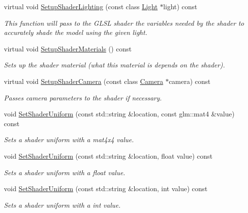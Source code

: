 \begin{DoxyCompactItemize}
virtual void \hyperlink{class_shader_program_a02cf3df43c59808160fce158ad655a40}{Setup\+Shader\+Lighting} (const class \hyperlink{class_light}{Light} $\ast$light) const
\begin{DoxyCompactList}\small\item\em This function will pass to the G\+L\+SL shader the variables needed by the shader to accurately shade the model using the given light. \end{DoxyCompactList}\item
virtual void \hyperlink{class_shader_program_a20ea5669f122fa6143e7fa8ee9d92578}{Setup\+Shader\+Materials} () const
\begin{DoxyCompactList}\small\item\em Sets up the shader material (what this material is depends on the shader). \end{DoxyCompactList}\item
virtual void \hyperlink{class_shader_program_abefd4e66aae75993f05bd607b6b0ed22}{Setup\+Shader\+Camera} (const class \hyperlink{class_camera}{Camera} $\ast$camera) const
\begin{DoxyCompactList}\small\item\em Passes camera parameters to the shader if necessary. \end{DoxyCompactList}\item
void \hyperlink{class_shader_program_a84ff179a393c8dcd55c38eef19925fef}{Set\+Shader\+Uniform} (const std\+::string \&location, const glm\+::mat4 \&value) const
\begin{DoxyCompactList}\small\item\em Sets a shader uniform with a mat4x4 value. \end{DoxyCompactList}\item
void \hyperlink{class_shader_program_a7ffbc023f4bb3ae2c8b458eb7182dff0}{Set\+Shader\+Uniform} (const std\+::string \&location, float value) const
\begin{DoxyCompactList}\small\item\em Sets a shader uniform with a float value. \end{DoxyCompactList}\item
void \hyperlink{class_shader_program_a16164eb7e3f1e2ca9bf60c492e43b4df}{Set\+Shader\+Uniform} (const std\+::string \&location, int value) const
\begin{DoxyCompactList}\small\item\em Sets a shader uniform with a int value. \end{DoxyCompactList}\item

\end{DoxyCompactItemize}
